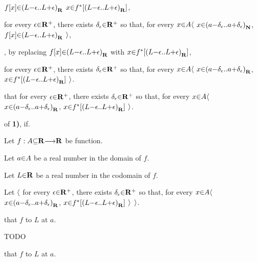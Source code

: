   \vs
  \hs {} $f[x] \p\in \a(L\p-\epsilon \a{..} L\p+\epsilon\a)_\R$  $x \p\in f^*[\a(L\p-\epsilon \a{..} L\p+\epsilon\a)_\R]$, \par
  \hs {}   for every $\epsilon \p\in \R^+$, there exists $\delta_\epsilon \p\in \R^+$ so that, for every $x \p\in A \a\langle$  $x \p\in \a(a\p-\delta_\epsilon \a{..} a\p+\delta_\epsilon\a)_\N$,  $f[x] \p\in \a(L\p-\epsilon \a{..} L\p+\epsilon\a)_\R$ $\a\rangle$, \par
  \hs {}, by replacing $f[x] \p\in \a(L\p-\epsilon \a{..} L\p+\epsilon\a)_\R$ with $x \p\in f^*[\a(L\p-\epsilon \a{..} L\p+\epsilon\a)_\R]$, \par
  \hs for every $\epsilon \p\in \R^+$, there exists $\delta_\epsilon \p\in \R^+$ so that, for every $x \p\in A \a\langle$  $x \p\in \a(a\p-\delta_\epsilon \a{..} a\p+\delta_\epsilon\a)_\R$,  $x \p\in f^*[\a(L\p-\epsilon \a{..} L\p+\epsilon\a)_\R]$ $\a\rangle$. \par

\vs
{} that for every $\epsilon \p\in \R^+$, there exists $\delta_\epsilon \p\in \R^+$ so that, for every $x \p\in A \a\langle$  $x \p\in \a(a\p-\delta_\epsilon \a{..} a\p+\delta_\epsilon\a)_\R$,  $x \p\in f^*[\a(L\p-\epsilon \a{..} L\p+\epsilon\a)_\R]$ $\a\rangle$. \par

\vs
{} of {\bf 1)}, if. \par
Let $f: A\p\subseteq\R \to \R$ be function. \par
Let $a \p\in A$  be a real number in the domain   of $f$. \par
Let $L \p\in \R$ be a real number in the codomain of $f$. \par
Let $\a\langle$ for every $\epsilon \p\in \R^+$, there exists $\delta_\epsilon \p\in \R^+$ so that, for every $x \p\in A \a\langle$  $x \p\in \a(a\p-\delta_\epsilon \a{..} a\p+\delta_\epsilon\a)_\R$,  $x \p\in f^*[\a(L\p-\epsilon \a{..} L\p+\epsilon\a)_\R]$ $\a\rangle$ $\a\rangle$. \par
{} that  $f$  to $L$ at $a$. \par

\hs \par
\hs TODO

\vs
{} that  $f$  to $L$ at $a$. \par

